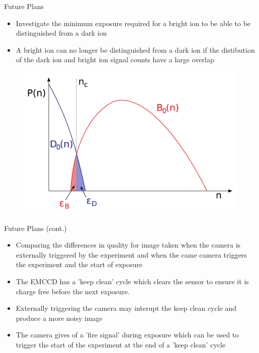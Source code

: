 \documentclass{beamer}
\begin{document}
\begin{frame}{Future Plans}

\begin{itemize}
\item Investigate the minimum exposure required for a bright ion to be able to be distinguished from a dark ion
\bigskip
\item A bright ion can no longer be distinguished from a dark ion if the distibution of the dark ion and bright ion signal counts have a large overlap

\end{itemize}

\begin{figure}
\centering
\includegraphics[scale=0.3]{Figures/B_D_graph.png}
\end{figure}

\end{frame}

\begin{frame}{Future Plans (cont.)}

\begin{itemize}
\item Comparing the differences in quality for image taken when the camera is externally triggered by the experiment and when the came camera triggers the experiment and the start of exposure
\bigskip
\item The EMCCD has a 'keep clean' cycle which clears the sensor to ensure it is charge free before the next exposure.
\bigskip
\item Externally triggering the camera may interupt the keep clean cycle and produce a more noisy image
\bigskip
\item The camera gives of a 'fire signal' during exposure which can be used to trigger the start of the experiment at the end of a 'keep clean' cycle
\end{itemize}


\end{frame}
\end{document}
